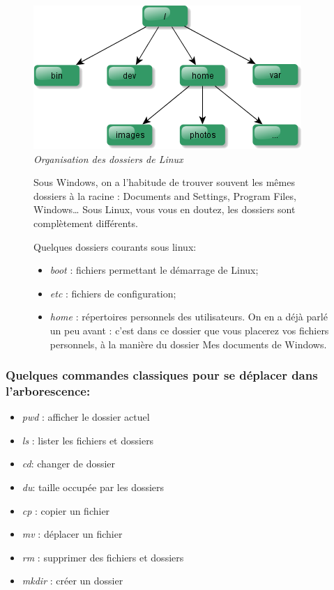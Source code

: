 \documentclass[10pt,fleqn]{article} %
\begin{document}
\begin{figure}[h]
\begin{minipage}[c]{.49\linewidth}
\begin{center}
\includegraphics[width=.9\textwidth]{images/archilin.png}
\textit{Organisation des dossiers de Linux}
\end{center}
\end{minipage} \hfill
\begin{minipage}[c]{.49\linewidth}

Sous Windows, on a l'habitude de trouver souvent les mêmes dossiers à la racine : Documents and Settings, Program Files, Windows… Sous Linux, vous vous en doutez, les dossiers sont complètement différents. 
\newline\newline

Quelques dossiers courants sous linux:
\begin{itemize}
\item \textit{boot} : fichiers permettant le démarrage de Linux;
\item \textit{etc} : fichiers de configuration;
\item \textit{home} : répertoires personnels des utilisateurs. On en a déjà parlé un peu avant : c'est dans ce dossier que vous placerez vos fichiers personnels, à la manière du dossier Mes documents de Windows.
\end{itemize}
\end{minipage}
\end{figure}


\subsubsection{Quelques commandes classiques pour se déplacer dans l'arborescence:}

\begin{itemize}
\item \textit{pwd} : afficher le dossier actuel
\item \textit{ls} : lister les fichiers et dossiers
\item \textit{cd}: changer de dossier
\item \textit{du}: taille occupée par les dossiers
\item \textit{cp} : copier un fichier
\item \textit{mv} : déplacer un fichier
\item \textit{rm} : supprimer des fichiers et dossiers
\item \textit{mkdir} : créer un dossier
\end{itemize}
\end{document}
